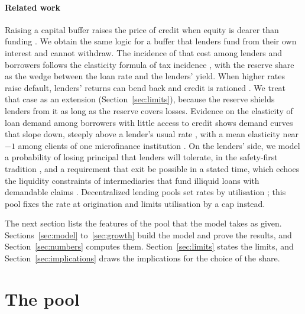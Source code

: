 \documentclass[preprint,11pt,authoryear]{elsarticle}
\theoremstyle{definition}
\begin{document}
\paragraph{Related work} Raising a capital buffer raises the price of credit when equity is dearer
than funding \citep{bcbs2010}. We obtain the same logic for a buffer that lenders fund from their
own interest and cannot withdraw. The incidence of that cost among lenders and borrowers follows
the elasticity formula of tax incidence \citep{harberger1962,fullerton2002}, with the reserve share
as the wedge between the loan rate and the lenders' yield. When higher rates raise default, lenders'
returns can bend back and credit is rationed \citep{stiglitz1981}. We treat that case as an
extension (Section~\ref{sec:limits}), because the reserve shields lenders from it as long as the
reserve covers losses. Evidence on the elasticity of loan demand among borrowers with little access
to credit shows demand curves that slope down, steeply above a lender's usual rate
\citep{karlan2008}, with a mean elasticity near $-1$ among clients of one microfinance institution
\citep{bogan2015}. On the lenders' side, we model a probability of losing principal that lenders will
tolerate, in the safety-first tradition \citep{roy1952,telser1955}, and a requirement that exit
be possible in a stated time, which echoes the liquidity constraints of intermediaries that fund
illiquid loans with demandable claims \citep{diamond1983,holmstrom1998}. Decentralized lending pools
set rates by utilisation \citep{leshner2019compound,aave2020,gudgeon2020}; this pool fixes the rate
at origination and limits utilisation by a cap instead.

The next section lists the features of the pool that the model takes as given. Sections~\ref{sec:model} to~\ref{sec:growth} build the model and prove the results, and
Section~\ref{sec:numbers} computes them. Section~\ref{sec:limits} states the limits, and
Section~\ref{sec:implications} draws the implications for the choice of the share.

\section{The pool}\label{sec:pool}
\end{document}
